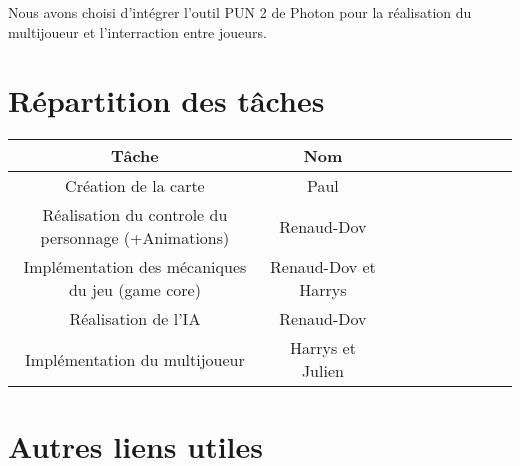\documentclass[12pt, letterpaper, twoside]{article}
\begin{document}
Nous avons choisi d'intégrer l'outil PUN 2 de Photon pour la réalisation du multijoueur et l'interraction entre joueurs.

\newpage
\section{Répartition des tâches}
\begin{center}
    \begin{tabular}{|*{10}{c|}}
        \hline
        \textbf{Tâche} & \textbf{Nom} \tabularnewline
        \hline
        Création de la carte & Paul\tabularnewline
        \hline
        Réalisation du controle du personnage (+Animations) & Renaud-Dov\tabularnewline
        \hline
        Implémentation des mécaniques du jeu (game core) & Renaud-Dov et Harrys\tabularnewline
        \hline
        Réalisation de l'IA & Renaud-Dov \tabularnewline
        \hline
        Implémentation du multijoueur & Harrys et Julien \tabularnewline
        \hline
    \end{tabular}
\end{center}





\section{Autres liens utiles}
\end{document}

